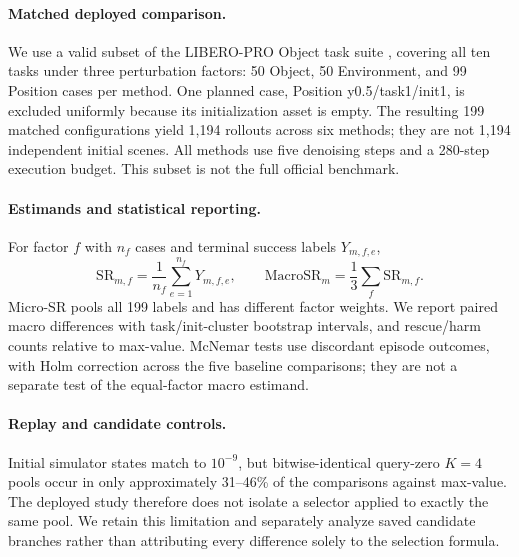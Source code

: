 \documentclass{article}
\begin{document}
\paragraph{Matched deployed comparison.}
We use a valid subset of the LIBERO-PRO Object task suite
\citep{libero,libero_pro}, covering all ten tasks under three perturbation
factors: 50 Object, 50 Environment, and 99 Position cases per method.
One planned case, Position y0.5/task1/init1, is excluded uniformly because
its initialization asset is empty. The resulting 199 matched configurations
yield 1,194 rollouts across six methods; they are not 1,194 independent
initial scenes. All methods use five denoising steps and a 280-step
execution budget. This subset is not the full official benchmark.

\paragraph{Estimands and statistical reporting.}
For factor $f$ with $n_f$ cases and terminal success labels $Y_{m,f,e}$,
\begin{equation}
 \mathrm{SR}_{m,f}=\frac{1}{n_f}\sum_{e=1}^{n_f}Y_{m,f,e},\qquad
 \mathrm{MacroSR}_m=\frac13\sum_f\mathrm{SR}_{m,f}.
 \label{eq:macro}
\end{equation}
Micro-SR pools all 199 labels and has different factor weights. We report
paired macro differences with task/init-cluster bootstrap intervals, and
rescue/harm counts relative to max-value. McNemar tests use discordant episode
outcomes, with Holm correction across the five baseline comparisons; they
are not a separate test of the equal-factor macro estimand.

\paragraph{Replay and candidate controls.}
Initial simulator states match to $10^{-9}$, but bitwise-identical query-zero
$K=4$ pools occur in only approximately 31--46\% of the comparisons against
max-value. The deployed study therefore does not isolate a selector applied
to exactly the same pool. We retain this limitation and separately analyze
saved candidate branches rather than attributing every difference solely to
the selection formula.
\end{document}
